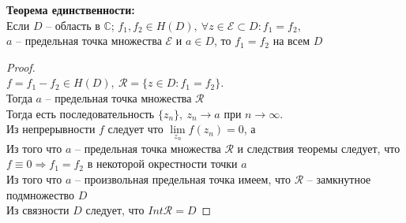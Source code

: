 \textbf{Теорема единственности:}\\[2mm]
Если $D$ -- область в $\mathbb{C}$; $f_1, f_2 \in H(D), \ \forall z \in \mathcal{E} \subset D: f_1 = f_2$,\\[2mm]
$a$ -- предельная точка множества $\mathcal{E}$ и $a \in D$, то $f_1 = f_2$ на всем $D$


\begin{proof}
    \ \\
    $f = f_1 - f_2 \in H(D), \ \mathcal{R} = \{z \in D: f_1 = f_2\}$. \\[2mm] 
    Тогда $a$ -- предельная точка множества $\mathcal{R}$ \\[2mm]
    Тогда есть последовательность $\{z_n\}, \ z_n \rightarrow a$ при $n \rightarrow \infty$. \\[2mm]
    Из непрерывности $f$ следует что $\lim \limits_{z_n}f(z_n) = 0$, а \\[2mm]
    Из того что $a$ -- предельная точка множества $\mathcal{R}$ и следствия теоремы следует, что \\[2mm] 
    $f \equiv 0 \Rightarrow f_1 = f_2$ в некоторой окрестности точки $a$ \\[2mm]
    Из того что $a$ -- произвольная предельная точка имеем, что $\mathcal{R}$ -- замкнутное подмножество $D$ \\[2mm]
    Из связности $D$ следует, что $Int \mathcal{R} = D$
\end{proof}
